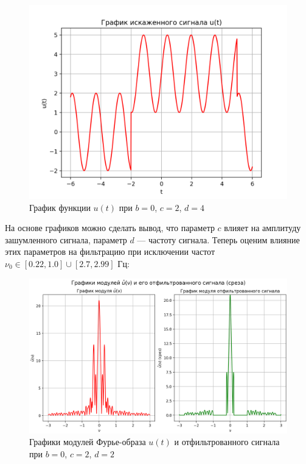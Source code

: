 \begin{figure}[ht!]
    \centering
    \includegraphics[scale=0.75]{media/1 task/specific_freq/Noisy_0_2_4.png}
    \caption{График функции $u(t)$ при $b=0$,  $c=2$,  $d=4$}
    \label{fig:noisy_0_2_4}
\end{figure}

На основе графиков можно сделать вывод, что параметр $c$ влияет на амплитуду зашумленного сигнала, параметр $d$ --- частоту сигнала. Теперь оценим влияние этих параметров на фильтрацию при исключении частот $\nu_0\in[0.22, 1.0] \cup [2.7, 2.99]$ Гц:


\begin{figure}[ht!]
    \centering
    \includegraphics[scale=0.55]{media/1 task/specific_freq/Fourier_Image_0_2_2_-1,0_-0,22_-2,99_-2,7.png}
    \caption{Графики модулей Фурье-образа $u(t)$ и отфильтрованного сигнала при $b=0$,  $c=2$,  $d=2$}
    \label{fig:four_0_2_2}
\end{figure}

